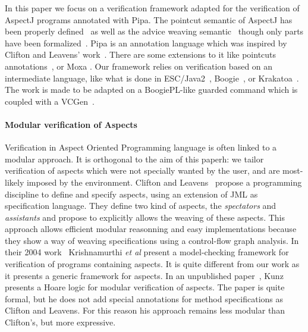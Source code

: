 In this paper we focus on a verification framework adapted for the
verification of AspectJ programs annotated with Pipa.  The pointcut
semantic of AspectJ has been properly
defined~\cite{DBLP:conf/popl/AvgustinovHOMSTV07} as well as the advice
weaving semantic~\cite{weaving04} though only parts have been
formalized~\cite{weaving06}.  Pipa is an annotation language which was
inspired by Clifton and Leavens' work~\cite{clifton02observers}. There
are some extensions to it like pointcuts
annotations~\cite{pointcuts07}, or Moxa \cite{moxa05}.  Our framework
relies on verification based on an intermediate language, like what is
done in ESC/Java2~\cite{FlanaganLLNSS02}, Boogie~\cite{BarnettCDJL05},
or Krakatoa~\cite{MarcheP-MU04}. The work is made to be adapted on a
BoogiePL-like guarded command which is coupled with a
VCGen~\cite{BarnettL05,FlanaganS01}.

\paragraph{Modular verification of Aspects}
Verification in Aspect Oriented Programming language is often linked
to a modular approach.  It is orthogonal to the aim of this paperh: we
tailor verification of aspects which were not specially wanted by the
user, and are most-likely imposed by the environment.  Clifton and
Leavens~\cite{clifton02observers,clifton02spectators,cliftonPhd}
propose a programming discipline to define and specify aspects, using
an extension of JML as specification language.  They define two kind
of aspects, the \emph{spectators} and \emph{assistants} and propose to
explicitly allows the weaving of these aspects. This approach allows
efficient modular reasonning and easy implementations because they
show a way of weaving specifications using a control-flow graph
analysis. In their 2004 work~\cite{shriram04} Krishnamurthi {\it et
al} present a model-checking framework for verification of programs
containing aspects. It is quite different from our work as it presents
a generic framework for aspects. In an unpublished paper~\cite{cesar},
Kunz presents a Hoare logic for modular verification of aspects. The
paper is quite formal, but he does not add special annotations for method
specifications as Clifton and Leavens. For this reason his approach remains 
less modular than Clifton's, but more expressive.











